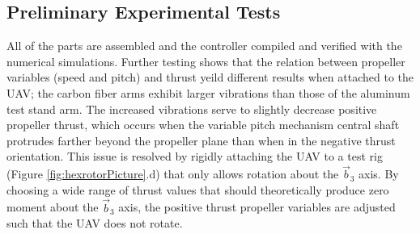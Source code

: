 \documentclass[twocolumn,letterpaper]{IEEEAerospaceCLS}  %
\begin{document}


\subsection{Preliminary Experimental Tests}


All of the parts are assembled and the controller compiled and verified with the numerical simulations. Further testing shows that the relation between propeller variables (speed and pitch) and thrust yeild different results when attached to the UAV; the carbon fiber arms exhibit larger vibrations than those of the aluminum test stand arm. The increased vibrations serve to slightly decrease positive propeller thrust, which occurs when the variable pitch mechanism central shaft protrudes farther beyond the propeller plane than when in the negative thrust orientation. This issue is resolved by rigidly attaching the UAV to a test rig (Figure \ref{fig:hexrotorPicture}.d) that only allows rotation about the $\vec b_3$ axis. By choosing a wide range of thrust values that should theoretically produce zero moment about the $\vec b_3$ axis, the positive thrust propeller variables are adjusted such that the UAV does not rotate.
\end{document}

